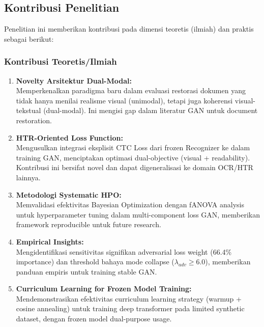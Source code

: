 \documentclass[12pt,a4paper]{article}
\begin{document}
\subsection{Kontribusi Penelitian}
\label{subsec:kontribusi}
\vspace{0.8em}

Penelitian ini memberikan kontribusi pada dimensi teoretis (ilmiah) dan praktis sebagai berikut:

\subsubsection{Kontribusi Teoretis/Ilmiah}

\begin{enumerate}[label=\arabic*., leftmargin=0.5cm]
    \item \textbf{Novelty Arsitektur Dual-Modal:} \\
    Memperkenalkan paradigma baru dalam evaluasi restorasi dokumen yang tidak hanya menilai realisme visual (unimodal), tetapi juga koherensi visual-tekstual (dual-modal). Ini mengisi gap dalam literatur GAN untuk document restoration.
    
    \item \textbf{HTR-Oriented Loss Function:} \\
    Mengusulkan integrasi eksplisit CTC Loss dari frozen Recognizer ke dalam training GAN, menciptakan optimasi dual-objective (visual + readability). Kontribusi ini bersifat novel dan dapat digeneralisasi ke domain OCR/HTR lainnya.
    
    \item \textbf{Metodologi Systematic HPO:} \\
    Memvalidasi efektivitas Bayesian Optimization dengan fANOVA analysis untuk hyperparameter tuning dalam multi-component loss GAN, memberikan framework reproducible untuk future research.
    
    \item \textbf{Empirical Insights:} \\
    Mengidentifikasi sensitivitas signifikan adversarial loss weight (66.4\% importance) dan threshold bahaya mode collapse ($\lambda_{adv} \geq 6.0$), memberikan panduan empiris untuk training stable GAN.
    
    \item \textbf{Curriculum Learning for Frozen Model Training:} \\
    Mendemonstrasikan efektivitas curriculum learning strategy (warmup + cosine annealing) untuk training deep transformer pada limited synthetic dataset, dengan frozen model dual-purpose usage.
\end{enumerate}
\end{document}
